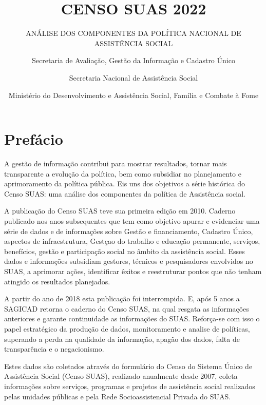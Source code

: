 \documentclass[
  brazilian]{report}
\title{CENSO SUAS 2022}
\subtitle{ANÁLISE DOS COMPONENTES DA POLÍTICA NACIONAL DE ASSISTÊNCIA
SOCIAL}
\author{Secretaria de Avaliação, Gestão da Informação e Cadastro
Único \and Secretaria Nacional de Assistência Social \and Ministério do
Desenvolvimento e Assistência Social, Família e Combate à Fome}
\date{}
\begin{document}
\maketitle

\addto\captionsbrazilian{\renewcommand{\figurename}{Gráfico}}

\captionsetup[figure]{labelfont=bf,textfont=bf}
\captionsetup[table]{labelfont=bf,textfont=bf}
\newcommand\fnote[1]{\captionsetup{font=small, textfont=normalfont}\caption*{#1}}
\captionsetup{justification=raggedright,singlelinecheck=false}

\hypertarget{prefuxe1cio}{%
\chapter*{Prefácio}\label{prefuxe1cio}}

A gestão de informação contribui para mostrar resultados, tornar mais
transparente a evolução da política, bem como subsidiar no planejamento
e aprimoramento da política pública. Eis uns dos objetivos a série
histórica do Censo SUAS: uma análise dos componentes da política de
Assistência social.

A publicação do Censo SUAS teve sua primeira edição em 2010. Caderno
publicado nos anos subsequentes que tem como objetivo apurar e
evidenciar uma série de dados e de informações sobre Gestão e
financiamento, Cadastro Único, aspectos de infraestrutura, Gestçao do
trabalho e educação permanente, serviços, benefícios, gestão e
participação social no âmbito da assistência social. Esses dados e
informações subsidiam gestores, técnicos e pesquisadores envolvidos no
SUAS, a aprimorar ações, identificar êxitos e reestruturar pontos que
não tenham atingido os resultados planejados.

A partir do ano de 2018 esta publicação foi interrompida. E, após 5 anos
a SAGICAD retorna o caderno do Censo SUAS, na qual resgata as
informações anteriores e garante continuidade as informações do SUAS.
Reforça-se com isso o papel estratégico da produção de dados,
monitoramento e analise de políticas, superando a perda na qualidade da
informação, apagão dos dados, falta de transparência e o negacionismo.

Estes dados são coletados através do formulário do Censo do Sistema
Único de Assistência Social (Censo SUAS), realizado anualmente desde
2007, coleta informações sobre serviços, programas e projetos de
assistência social realizados pelas unidades públicas e pela Rede
Socioassistencial Privada do SUAS.
\end{document}
